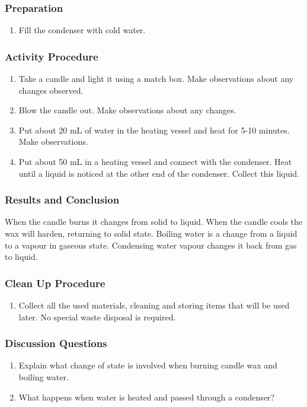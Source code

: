 \subsubsection*{Preparation}
\begin{enumerate}
\item{Fill the condenser with cold water.}
\end{enumerate}

\subsubsection*{Activity Procedure}
\begin{enumerate}
\item{Take a candle and light it using a match box. Make observations about any changes observed.}
\item{Blow the candle out. Make observations about any changes.}
\item{Put about 20 mL of water in the heating vessel and heat for 5-10 minutes. Make observations.}
\item{Put about 50 mL in a heating vessel and connect with the condenser. Heat until a liquid is noticed at the other end of the condenser. Collect this liquid.}
\end{enumerate}

\subsubsection*{Results and Conclusion}
When the candle burns it changes from solid to liquid. When the candle cools the wax will harden, returning to solid state.
Boiling water is a change from a liquid to a vapour in gaseous state. Condensing water vapour changes it back from gas to liquid.

\subsubsection*{Clean Up Procedure}
\begin{enumerate}
\item{Collect all the used materials, cleaning and storing items that will be used later. No special waste disposal is required.}
\end{enumerate}

\subsubsection*{Discussion Questions}
\begin{enumerate}
\item{Explain what change of state is involved when burning candle wax and boiling water.}
\item{What happens when water is heated and passed through a condenser?}
\end{enumerate}

